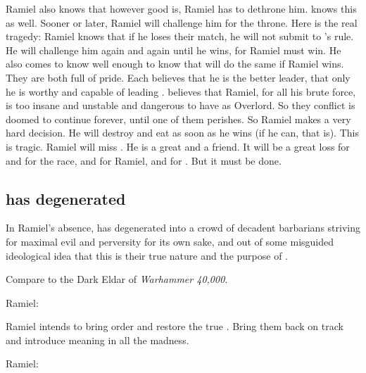 Ramiel also knows that however good \Dasteron is, Ramiel has to dethrone him.
\Dasteron knows this as well.
Sooner or later, Ramiel will challenge him for the throne.
Here is the real tragedy:
Ramiel knows that if he loses their match, he will not submit to \Dasteron's rule.
He will challenge him again and again until he wins, for Ramiel must win.
He also comes to know \Dasteron well enough to know that \Dasteron will do the same if Ramiel wins.
They are both full of pride.
Each believes that he is the better leader, that only he is worthy and capable of leading \Mystraacht.
\Dasteron believes that Ramiel, for all his brute force, is too insane and unstable and dangerous to have as Overlord.
So they conflict is doomed to continue forever, until one of them perishes.
So Ramiel makes a very hard decision.
He will destroy and eat \Dasteron as soon as he wins (if he can, that is). 
This is tragic.
Ramiel will miss \Dasteron.
He is a great \resphan and a friend.
It will be a great loss for \Mystraacht and for the \resphan race, and for Ramiel, and for \Cishiel.
But it must be done.










\subsection[Mystraacht has degenerated]{\Mystraacht has degenerated}
In Ramiel's absence, \Mystraacht{} has degenerated into a crowd of decadent barbarians striving for maximal evil and perversity for its own sake, and out of some misguided ideological idea that this is their true nature and the purpose of \Mystraacht. 

Compare to the Dark Eldar of \emph{Warhammer 40,000}.

Ramiel: 

Ramiel intends to bring order and restore the true \Mystraacht. 
Bring them back on track and introduce meaning in all the madness. 

Ramiel: 

